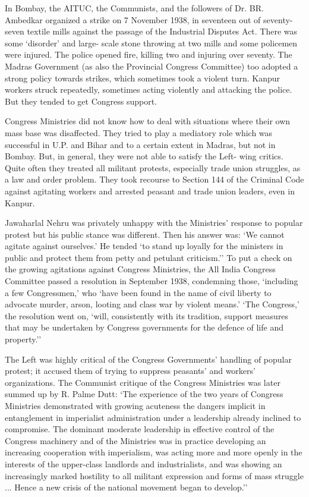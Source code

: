\begin{multicols}{2}
In Bombay, the AITUC, the Communists, and the followers of Dr. BR. Ambedkar organized a strike on 7 November 1938, in seventeen out of seventy-seven textile mills against the passage of the Industrial Disputes Act. There was some `disorder' and large- scale stone throwing at two mills and some policemen were injured. The police opened fire, killing two and injuring over seventy. The Madras Government (as also the Provincial Congress Committee) too adopted a strong policy towards strikes, which sometimes took a violent turn. Kanpur workers struck repeatedly, sometimes acting violently and attacking the police. But they tended to get Congress support. 

Congress Ministries did not know how to deal with situations where their own mass base was disaffected. They tried to play a mediatory role which was successful in U.P. and Bihar and to a certain extent in Madras, but not in Bombay. But, in general, they were not able to satisfy the Left- wing critics. Quite often they treated all militant protests, especially trade union struggles, as a law and order problem. They took recourse to Section 144 of the Criminal Code against agitating workers and arrested peasant and trade union leaders, even in Kanpur. 

Jawaharlal Nehru was privately unhappy with the Ministries' response to popular protest but his public stance was different. Then his answer was: `We cannot agitate against ourselves.' He tended `to stand up loyally for the ministers in public and protect them from petty and petulant criticism.'' To put a check on the growing agitations against Congress Ministries, the All India Congress Committee passed a resolution in September 1938, condemning those, `including a few Congressmen,' who `have been found in the name of civil liberty to advocate murder, arson, looting and class war by violent means.' `The Congress,' the resolution went on, `will, consistently with its tradition, support measures that may be undertaken by Congress governments for the defence of life and property.'' 

The Left was highly critical of the Congress Governments' handling of popular protest; it accused them of trying to suppress peasants' and workers' organizations. The Communist critique of the Congress Ministries was later summed up by R. Palme Dutt: `The experience of the two years of Congress Ministries demonstrated with growing acuteness the dangers implicit in entanglement in imperialist administration under a leadership already inclined to compromise. The dominant moderate leadership in effective control of the Congress machinery and of the Ministries was in practice developing an increasing cooperation with imperialism, was acting more and more openly in the interests of the upper-class landlords and industrialists, and was showing an increasingly marked hostility to all militant expression and forms of mass struggle ... Hence a new crisis of the national movement began to develop.'' 


\end{multicols}
